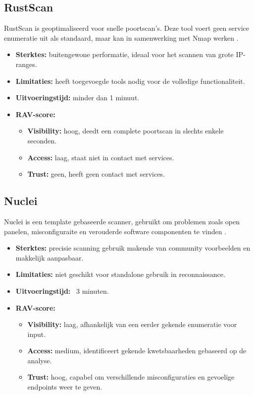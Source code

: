 \subsection{RustScan}

RustScan is geoptimaliseerd voor snelle poortscan's. 
Deze tool voert geen service enumeratie uit als standaard, maar kan in samenwerking met Nmap werken \autocite{RustScan}. 

\begin{itemize}
  \item \textbf{Sterktes:} buitengewone performatie, ideaal voor het scannen van grote IP-ranges.
  \item \textbf{Limitaties:} heeft toegevoegde tools nodig voor de volledige functionaliteit. 
  \item \textbf{Uitvoeringstijd:} minder dan 1 minuut.
  \item \textbf{RAV-score:}
    \small{
    \begin{itemize}
      \item \textbf{Visibility:} hoog, deedt een complete poortscan in slechts enkele seconden.
      \item \textbf{Access:} laag, staat niet in contact met services. 
      \item \textbf{Trust:} geen, heeft geen contact met services.
    \end{itemize}
    }
\end{itemize}

\subsection{Nuclei}
Nuclei is een template gebaseerde scanner, gebruikt om problemen zoals open panelen, misconfiguraite en verouderde software componenten te vinden \autocite{Nuclei}.

\begin{itemize}
  \item \textbf{Sterktes:} precisie scanning gebruik makende van community voorbeelden en makkelijk aanpasbaar.
  \item \textbf{Limitaties:} niet geschikt voor standalone gebruik in reconnaissance.
  \item \textbf{Uitvoeringstijd:} ~3 minuten.
  \item \textbf{RAV-score:}
    \small{
    \begin{itemize}
      \item \textbf{Visibility:} laag, afhankelijk van een eerder gekende enumeratie voor input. 
      \item \textbf{Access:} medium, identificeert gekende kwetsbaarheden gebaseerd op de analyse.
      \item \textbf{Trust:} hoog, capabel om verschillende misconfiguraties en gevoelige endpoints weer te geven.
    \end{itemize}
    }
\end{itemize}

